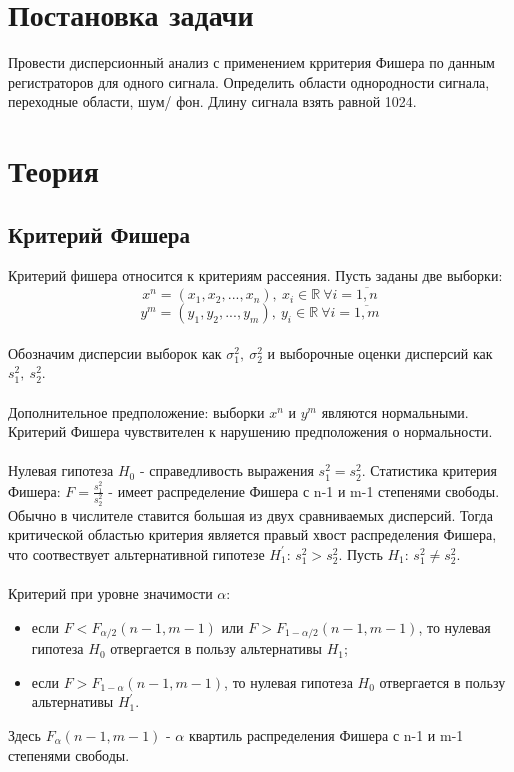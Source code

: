 \documentclass[a4paper]{article}
\begin{document}
    
    \tableofcontents
    \newpage
	\listoffigures
    \newpage
    \listoftables
    \newpage

\section {Постановка задачи}
\noindent Провести дисперсионный анализ с применением крритерия Фишера по данным регистраторов для одного сигнала.
Определить области однородности сигнала, переходные области, шум/ фон.
Длину сигнала взять равной 1024.

\section{Теория}
\subsection{Критерий Фишера}
Критерий фишера относится к критериям рассеяния. Пусть заданы две выборки:
$$x^n = (x_1, x_2, ..., x_n),\ x_i \in \mathbb{R} \ \forall i = \overline{1, n}$$
$$y^m = (y_1, y_2, ..., y_m),\ y_i \in \mathbb{R} \ \forall i = \overline{1, m}$$
\\
Обозначим дисперсии выборок как $\sigma_1^2, \ \sigma_2^2$ и выборочные оценки дисперсий как $s_1^2, \ s_2^2$. \\
\\
Дополнительное предположение: выборки $x^n$ и $y^m$ являются нормальными. Критерий Фишера чувствителен к нарушению предположения о нормальности.\\
\\
Нулевая гипотеза $H_0$ - справедливость выражения $s_1^2 = s_2^2$. Статистика критерия Фишера: $F = \frac{s_1^2}{s_2^2}$ - имеет распределение Фишера с n-1 и m-1 степенями свободы. Обычно в числителе ставится большая из двух сравниваемых дисперсий. Тогда критической областью критерия является правый хвост распределения Фишера, что соотвествует альтернативной гипотезе $H_1^'$: $s_1^2 > s_2^2$. Пусть $H_1$: $s_1^2 \neq s_2^2.$\\
\\
Критерий при уровне значимости $\alpha$:
\begin{itemize}
    \item если $F < F_{\alpha/2}(n-1, m-1)$ или $F > F_{1 - \alpha/2}(n-1, m-1)$, то нулевая гипотеза $H_0$ отвергается в пользу альтернативы $H_1$;

    \item если $F > F_{1 - \alpha}(n-1, m-1)$, то нулевая гипотеза $H_0$ отвергается в пользу альтернативы $H_1^'$.
\end{itemize}
Здесь $F_{\alpha}(n-1, m-1)$ - $\alpha$ квартиль распределения Фишера с n-1 и m-1 степенями свободы.
\end{document}
